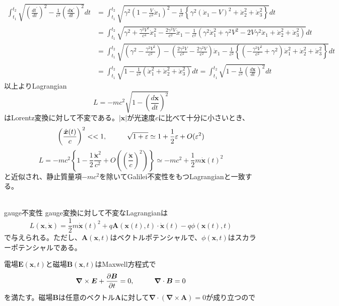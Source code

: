 \documentclass{jsarticle}
\begin{document}
\begin{align*}
\int_{t_{1}}^{t_{2}}\sqrt{\left(\frac{dt^{\prime}}{dt}\right)^{2}-\frac{1}{c^{2}}\left(\frac{d\bm{x}^{\prime}}{dt}\right)^{2}}dt&=\int_{t_{1}}^{t_{2}}\sqrt{\gamma^{2}\left(1-\frac{V}{c^{2}}\dot{x}_{1}\right)^{2}-\frac{1}{c^{2}}\left\{\gamma^{2}(\dot{x}_{1}-V)^{2}+\dot{x}_{2}^{2}+\dot{x}_{3}^{2}\right\}}dt\\
&=\int_{t_{1}}^{t_{2}}\sqrt{\gamma^{2}+\frac{\gamma^{2}V^{2}}{c^{4}}\dot{x}_{1}^{2}-\frac{2\gamma^{2}V}{c^{2}}\dot{x}_{1}-\frac{1}{c^{2}}\left(\gamma^{2}\dot{x}_{1}^{2}+\gamma^{2}V^{2}-2V\gamma^{2}\dot{x}_{1}+\dot{x}_{2}^{2}+\dot{x}_{3}^{2}\right)}dt\\
&=\int_{t_{1}}^{t_{2}}\sqrt{\left(\gamma^{2}-\frac{\gamma^{2}V^{2}}{c^{2}}\right)-\left(\frac{2\gamma^{2}V}{c^{2}}-\frac{2\gamma^{2}V}{c^{2}}\right)\dot{x}_{1}-\frac{1}{c^{2}}\left\{\left(-\frac{\gamma^{2}V^{2}}{c^{2}}+\gamma^{2}\right)\dot{x}_{1}^{2}+\dot{x}_{2}^{2}+\dot{x}_{3}^{2}\right\}}dt\\
&=\int_{t_{1}}^{t_{2}}\sqrt{1-\frac{1}{c^{2}}\left(\dot{x}_{1}^{2}+\dot{x}_{2}^{2}+\dot{x}_{3}^{2}\right)}dt=\int_{t_{1}}^{t_{2}}\sqrt{1-\frac{1}{c^{2}}\left(\frac{d\bm{x}}{dt}\right)^{2}}dt
\end{align*}
以上よりLagrangian
\[L=-mc^{2}\sqrt{1-\left(\frac{d\bm{x}}{dt}\right)^{2}}\]
はLorentz変換に対して不変である。\(|\bm{x}|\)が光速度\(c\)に比べて十分に小さいとき、
\[\left(\frac{\dot{\bm{x}}(t)}{c}\right)^{2}<<1,\hspace{10mm}\sqrt{1+\varepsilon}\simeq1+\frac{1}{2}\varepsilon+O(\varepsilon^{2})\]
\[L=-mc^{2}\left\{1-\frac{1}{2}\frac{\dot{\bm{x}}^{2}}{c^{2}}+O\left(\left(\frac{\dot{\bm{x}}}{c}\right)^{2}\right)\right\}\simeq-mc^{2}+\frac{1}{2}m\dot{\bm{x}}(t)^{2}\]
と近似され、静止質量項\(-mc^{2}\)を除いてGalilei不変性をもつLagrangianと一致する。\\
\\
\begin{itembox}[l]{gauge不変性}
gauge変換に対して不変なLagrangianは
\[L(\bm{x},\dot{\bm{x}})=\frac{1}{2}m\dot{\bm{x}}(t)^{2}+q\bm{A}(\bm{x}(t),t)\cdot\dot{\bm{x}}(t)-q\phi(\bm{x}(t),t)\]
で与えられる。ただし、\(\bm{A}(\bm{x},t)\)はベクトルポテンシャルで、\(\phi(\bm{x},t)\)はスカラーポテンシャルである。
\end{itembox}
電場\(\bm{E}(\bm{x},t)\)と磁場\(\bm{B}(\bm{x},t)\)はMaxwell方程式で
\[\bm{\nabla}\times\bm{E}+\frac{\partial\bm{B}}{\partial t}=0,\hspace{10mm}\bm{\nabla}\cdot\bm{B}=0\]
を満たす。磁場\(\bm{B}\)は任意のベクトル\(\bm{A}\)に対して\(\bm{\nabla}\cdot(\bm{\nabla}\times\bm{A})=0\)が成り立つので
\end{document}
